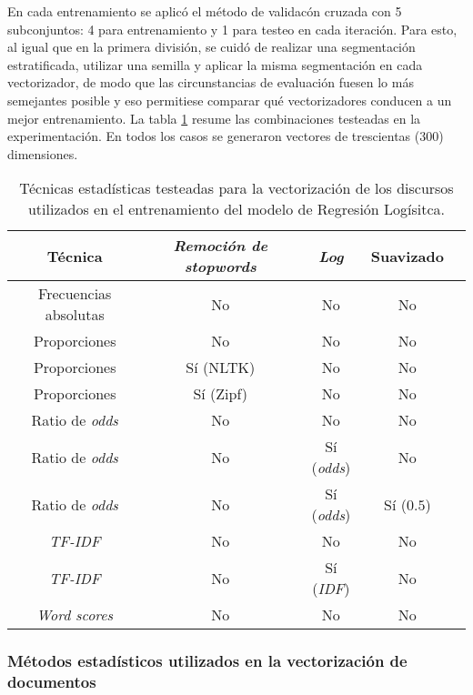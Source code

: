 En cada entrenamiento se aplic\'o el m\'etodo
de validac\'on cruzada con 5 subconjuntos: 4 para entrenamiento y 1 para testeo
en cada iteraci\'on.
Para esto, al igual que en la primera divisi\'on, se cuid\'o de realizar
una segmentaci\'on estratificada, utilizar una semilla y
aplicar la misma segmentaci\'on en cada vectorizador,
de modo que las circunstancias de evaluaci\'on fuesen lo m\'as semejantes posible
y eso permitiese comparar qu\'e vectorizadores conducen a un mejor entrenamiento.
La tabla \ref{table-methods-vectorizers} resume las combinaciones testeadas
en la experimentaci\'on. En todos los casos se generaron vectores de trescientas
($300$) dimensiones.

\begin{table}[ht]
\centering
\begin{tabular}{ |c|c|c|c|c| }
    \hline
    T\'ecnica & \textit{Remoci\'on de stopwords} & \textit{Log} & Suavizado \\
    \hline\hline
    Frecuencias absolutas & No & No & No \\
    \hline
    Proporciones & No & No & No \\
    \hline
    Proporciones & S\'i (NLTK) & No & No \\
    \hline
    Proporciones & S\'i (Zipf) & No & No \\
    \hline
    Ratio de \textit{odds} & No & No & No \\
    \hline
    Ratio de \textit{odds} & No & S\'i (\textit{odds}) & No \\
    \hline
    Ratio de \textit{odds} & No & S\'i (\textit{odds}) & S\'i ($0.5$) \\
    \hline
    \textit{TF-IDF} & No & No & No \\
    \hline
    \textit{TF-IDF} & No & S\'i (\textit{IDF}) & No \\
    \hline
    \textit{Word scores} & No & No & No \\
    \hline
\end{tabular}
\caption{T\'ecnicas estad\'isticas testeadas para la vectorizaci\'on de los
discursos utilizados en el entrenamiento del modelo de Regresi\'on Log\'isitca.}
\label{table-methods-vectorizers}
\end{table}

\subsubsection{M\'etodos estad\'isticos utilizados en la vectorizaci\'on de documentos}
\label{subsubsec-methods-vectorizers}

